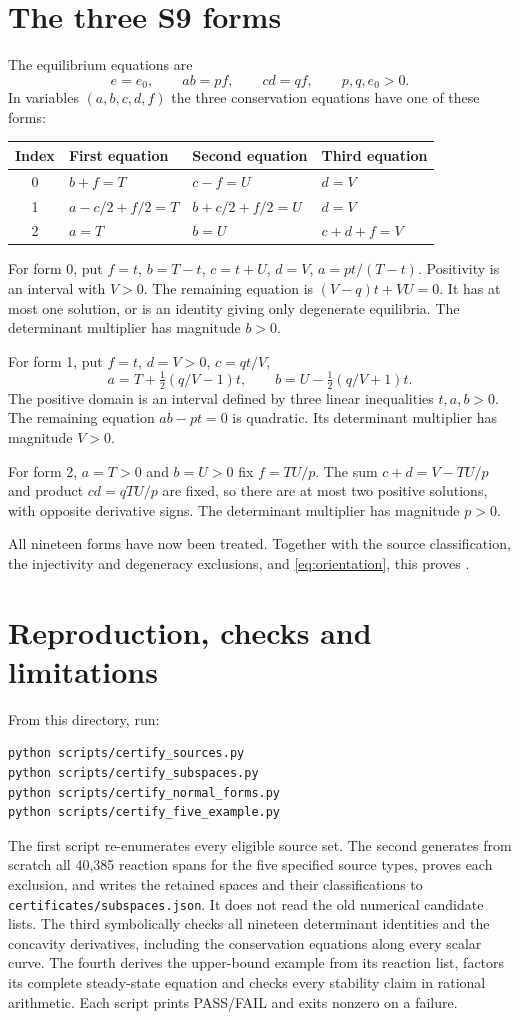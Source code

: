 \documentclass[11pt,a4paper]{report}
\begin{document}
\section{The three S9 forms}
The equilibrium equations are
\[
 e=e_0,\qquad ab=pf,\qquad cd=qf,\qquad p,q,e_0>0.
\]
In variables $(a,b,c,d,f)$ the three conservation equations have one of these forms:
\begin{center}\small
\begin{tabular}{clll}
\toprule
Index & First equation & Second equation & Third equation\\
\midrule
0 &$b+f=T$ &$c-f=U$ &$d=V$\\
1 &$a-c/2+f/2=T$ &$b+c/2+f/2=U$ &$d=V$\\
2 &$a=T$ &$b=U$ &$c+d+f=V$\\
\bottomrule
\end{tabular}
\end{center}
For form 0, put $f=t$, $b=T-t$, $c=t+U$, $d=V$, $a=pt/(T-t)$.
Positivity is an interval with $V>0$. The remaining equation is
$(V-q)t+VU=0$. It has at most one solution, or is an identity giving only degenerate equilibria.
The determinant multiplier has magnitude $b>0$.

For form 1, put $f=t$, $d=V>0$, $c=qt/V$,
\[
 a=T+\tfrac12(q/V-1)t,\qquad
 b=U-\tfrac12(q/V+1)t.
\]
The positive domain is an interval defined by three linear inequalities $t,a,b>0$.
The remaining equation $ab-pt=0$ is quadratic. Its determinant multiplier has magnitude $V>0$.

For form 2, $a=T>0$ and $b=U>0$ fix $f=TU/p$.
The sum $c+d=V-TU/p$ and product $cd=qTU/p$ are fixed, so there are at most two positive
solutions, with opposite derivative signs. The determinant multiplier has magnitude $p>0$.

All nineteen forms have now been treated. Together with the source classification, the injectivity
and degeneracy exclusions, and \eqref{eq:orientation}, this proves .

\section{Reproduction, checks and limitations}
From this directory, run:
\begin{verbatim}
python scripts/certify_sources.py
python scripts/certify_subspaces.py
python scripts/certify_normal_forms.py
python scripts/certify_five_example.py
\end{verbatim}
The first script re-enumerates every eligible source set. The second generates from scratch all
40,385 reaction spans for the five specified source types, proves each exclusion, and writes the
retained spaces and their classifications to \texttt{certificates/subspaces.json}. It does not read
the old numerical candidate lists. The third symbolically checks all nineteen determinant identities
and the concavity derivatives, including the conservation equations along every scalar curve.
The fourth derives the upper-bound example from its reaction list, factors its complete steady-state
equation and checks every stability claim in rational arithmetic.
Each script prints PASS/FAIL and exits nonzero on a failure.
\end{document}
